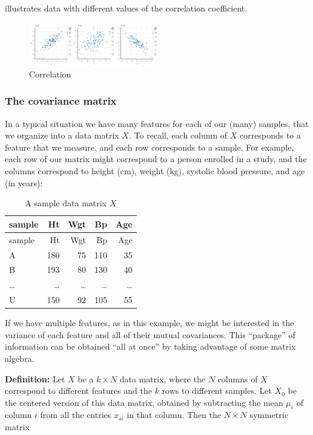 \documentclass[
]{article}
\begin{document}
 illustrates data with different values of the
correlation coefficient.

\begin{figure}
\hypertarget{fig:corrfig}{%
\centering
\includegraphics[width=0.5\textwidth,height=\textheight]{../img/correlation.png}
\caption{Correlation}\label{fig:corrfig}
}
\end{figure}

\hypertarget{sec:covarmat}{%
\subsubsection{The covariance matrix}\label{sec:covarmat}}

In a typical situation we have many features for each of our (many)
samples, that we organize into a data matrix \(X\). To recall, each
column of \(X\) corresponds to a feature that we measure, and each row
corresponds to a sample. For example, each row of our matrix might
correspond to a person enrolled in a study, and the columns correspond
to height (cm), weight (kg), systolic blood pressure, and age (in
years):

\begin{longtable}[]{@{}lrrrr@{}}
\caption{A sample data matrix \(X\) \label{tbl:data}}\tabularnewline
\toprule
sample & Ht & Wgt & Bp & Age\tabularnewline
\midrule
\endfirsthead
\toprule
sample & Ht & Wgt & Bp & Age\tabularnewline
\midrule
\endhead
A & 180 & 75 & 110 & 35\tabularnewline
B & 193 & 80 & 130 & 40\tabularnewline
\ldots{} & \ldots{} & \ldots{} & \ldots{} & \ldots{}\tabularnewline
U & 150 & 92 & 105 & 55\tabularnewline
\bottomrule
\end{longtable}

If we have multiple features, as in this example, we might be interested
in the variance of each feature and all of their mutual covariances.
This ``package'' of information can be obtained ``all at once'' by
taking advantage of some matrix algebra.

\textbf{Definition:} Let \(X\) be a \(k\times N\) data matrix, where the
\(N\) columns of \(X\) correspond to different features and the \(k\)
rows to different samples. Let \(X_{0}\) be the centered version of this
data matrix, obtained by subtracting the mean \(\mu_{i}\) of column
\(i\) from all the entries \(x_{si}\) in that column. Then the
\(N\times N\) symmetric matrix
\end{document}
